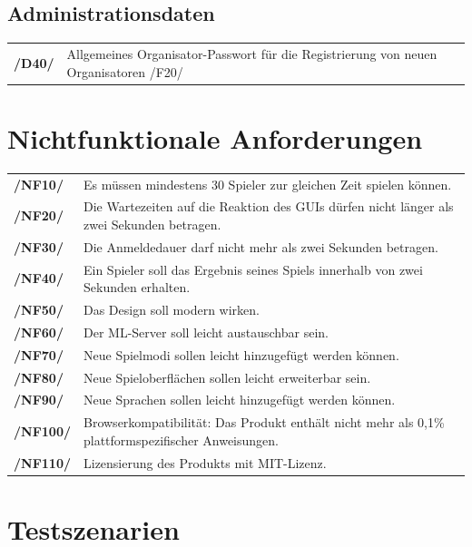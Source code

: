 \documentclass[a4paper]{scrreprt}
\begin{document}
    \section{Administrationsdaten}
    \begin{tabularx}{\linewidth}{@{}>{\bfseries}l@{\hspace{.5em}}X@{}}
        /D40/ & Allgemeines Organisator-Passwort für die Registrierung von neuen Organisatoren /F20/
    \end{tabularx}

    \chapter{Nichtfunktionale Anforderungen}

    \begin{tabularx}{\linewidth}{@{}>{\bfseries}l@{\hspace{.5em}}X@{}}
        /NF10/ & Es müssen mindestens 30 Spieler zur gleichen Zeit spielen können.\\
        /NF20/ & Die Wartezeiten auf die Reaktion des GUIs dürfen nicht länger als zwei Sekunden betragen. \\
	/NF30/ & Die Anmeldedauer darf nicht mehr als zwei Sekunden betragen. \\
        /NF40/ & Ein Spieler soll das Ergebnis seines Spiels innerhalb von zwei Sekunden erhalten. \\
        /NF50/ & Das Design soll modern wirken. \\
        /NF60/ & Der \Gls{ML-Server} soll leicht austauschbar sein. \\
        /NF70/ & Neue Spielmodi sollen leicht hinzugefügt werden können. \\
        /NF80/ & Neue Spieloberflächen sollen leicht erweiterbar sein. \\
        /NF90/ & Neue Sprachen sollen leicht hinzugefügt werden können. \\
        /NF100/ & Browserkompatibilität: Das Produkt enthält nicht mehr als 0,1\% plattformspezifischer Anweisungen. \\
        /NF110/ & Lizensierung des Produkts mit MIT-Lizenz.
    \end{tabularx}

    \chapter{Testszenarien}
\end{document}
